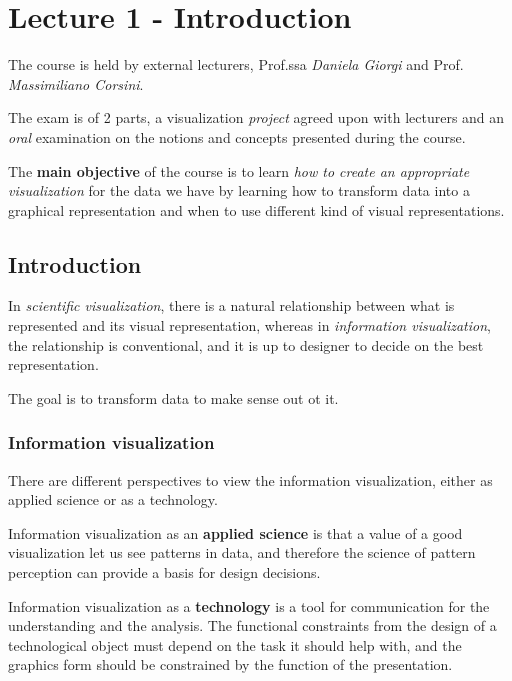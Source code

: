 \chapter{Lecture 1 - Introduction}
The course is held by external lecturers, Prof.ssa \textit{Daniela Giorgi} and Prof. \textit{Massimiliano Corsini}.\par
The exam is of 2 parts, a visualization \emph{project} agreed upon with lecturers and an \emph{oral} examination on the notions and concepts presented during the course.\par
The \textbf{main objective} of the course is to learn \textit{how to create an appropriate visualization} for the data we have by learning how to transform data into a graphical representation and when to use different kind of visual representations.

\section{Introduction}
In \textit{scientific visualization}, there is a natural relationship between what is represented and its visual representation, whereas in \textit{information visualization}, the relationship is conventional, and it is up to designer to decide on the best representation. \par
The goal is to transform data to make sense out ot it. 
\subsection{Information visualization}
There are different perspectives to view the information visualization, either as applied science or as a technology.\par
Information visualization as an \textbf{applied science} is that a value of a good visualization let us see patterns in data, and therefore the science of pattern perception can provide a basis for design decisions.\par

Information visualization as a \textbf{technology} is a tool for communication for the understanding and the analysis. The functional constraints from the design of a technological object must depend on the task it should help with, and the graphics form should be constrained by the function of the presentation.\par

